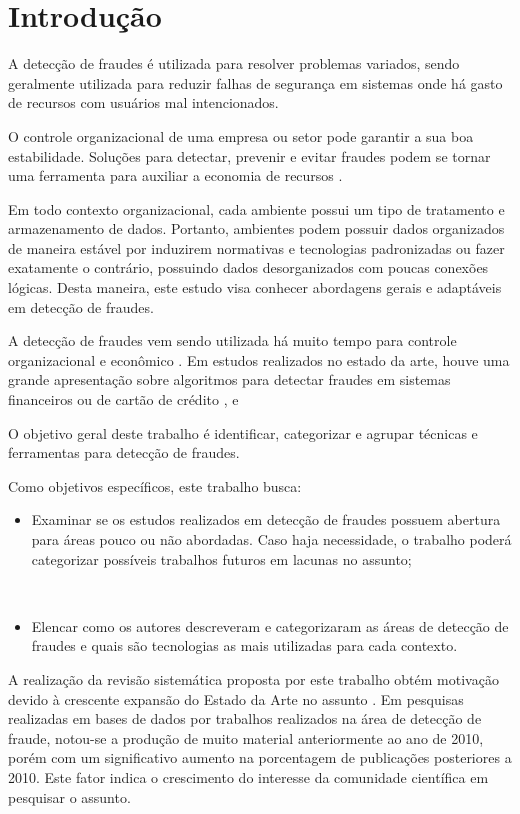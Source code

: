 \documentclass[smallextended]{svjour3}
\begin{document}
\section{Introdução}
\label{sec:1}

A detecção de fraudes é utilizada para resolver problemas variados, sendo geralmente utilizada para reduzir falhas de segurança em sistemas onde há gasto de recursos com usuários mal intencionados.

O controle organizacional de uma empresa ou setor pode garantir a sua boa estabilidade. Soluções para detectar, prevenir e evitar fraudes podem se tornar uma ferramenta para auxiliar a economia de recursos \citep{809570}. 

Em todo contexto organizacional, cada ambiente possui um tipo de tratamento e armazenamento de dados. Portanto, ambientes podem possuir dados organizados de maneira estável por induzirem normativas e tecnologias padronizadas ou fazer exatamente o contrário, possuindo dados desorganizados com poucas conexões lógicas. Desta maneira, este estudo visa conhecer abordagens gerais e adaptáveis em detecção de fraudes.

A detecção de fraudes vem sendo utilizada há muito tempo para controle organizacional e econômico \citep{Seyedhossein2010}. Em estudos realizados no estado da arte, houve uma grande apresentação sobre algoritmos para detectar fraudes em sistemas financeiros ou de cartão de crédito \citep{809570}, \citep{Chandola:2009:ADS:1541880.1541882} e \citep{Abdallah2016}

O objetivo geral deste trabalho é identificar, categorizar e agrupar técnicas e ferramentas para detecção de fraudes.

Como objetivos específicos, este trabalho busca:

\begin{itemize}
	\item Examinar se os estudos realizados em detecção de fraudes possuem abertura para áreas pouco ou não abordadas. Caso haja necessidade, o trabalho poderá categorizar possíveis trabalhos futuros em lacunas no assunto;
	
	\
	
	\item Elencar como os autores descreveram e categorizaram as áreas de detecção de fraudes e quais são tecnologias as mais utilizadas para cada contexto.
\end{itemize}

A realização da revisão sistemática proposta por este trabalho obtém motivação devido à crescente expansão do Estado da Arte no assunto \citep{Pejic-Bach2010}. Em pesquisas realizadas em bases de dados por trabalhos realizados na área de detecção de fraude, notou-se a produção de muito material anteriormente ao ano de 2010, porém com um significativo aumento na porcentagem de publicações posteriores a 2010. Este fator indica o crescimento do interesse da comunidade científica em pesquisar o assunto.
\end{document}
